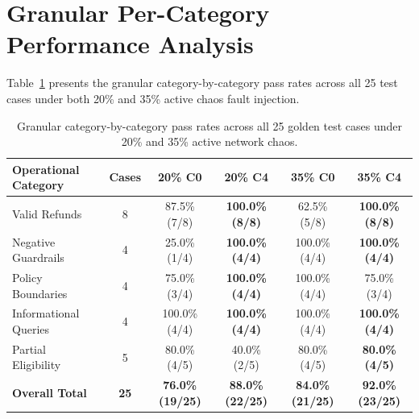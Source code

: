 \section{Granular Per-Category Performance Analysis}

Table~\ref{tab:category_results} presents the granular category-by-category pass rates across all 25 test cases under both 20\% and 35\% active chaos fault injection.

\begin{table}[H]
\centering
\small
\renewcommand{\arraystretch}{1.25}
\begin{tabular}{|p{3.8cm}|c|c|c|c|c|}
\hline
\rowcolor{gray!15}
\textbf{Operational Category} & \textbf{Cases} & \textbf{20\% C0} & \textbf{20\% C4} & \textbf{35\% C0} & \textbf{35\% C4} \\
\hline
Valid Refunds & 8 & 87.5\% (7/8) & \textbf{100.0\% (8/8)} & 62.5\% (5/8) & \textbf{100.0\% (8/8)} \\
\hline
Negative Guardrails & 4 & 25.0\% (1/4) & \textbf{100.0\% (4/4)} & 100.0\% (4/4) & \textbf{100.0\% (4/4)} \\
\hline
Policy Boundaries & 4 & 75.0\% (3/4) & \textbf{100.0\% (4/4)} & 100.0\% (4/4) & 75.0\% (3/4) \\
\hline
Informational Queries & 4 & 100.0\% (4/4) & \textbf{100.0\% (4/4)} & 100.0\% (4/4) & \textbf{100.0\% (4/4)} \\
\hline
Partial Eligibility & 5 & 80.0\% (4/5) & 40.0\% (2/5) & 80.0\% (4/5) & \textbf{80.0\% (4/5)} \\
\hline
\textbf{Overall Total} & \textbf{25} & \textbf{76.0\% (19/25)} & \textbf{88.0\% (22/25)} & \textbf{84.0\% (21/25)} & \textbf{92.0\% (23/25)} \\
\hline
\end{tabular}
\caption{Granular category-by-category pass rates across all 25 golden test cases under 20\% and 35\% active network chaos.}
\label{tab:category_results}
\end{table}

